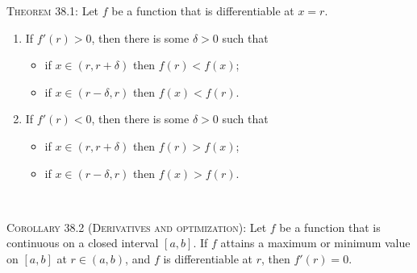 \documentclass[12pt]{amsart}
\numberwithin{equation}{section}
\theoremstyle{plain} %
\theoremstyle{definition}
\theoremstyle{remark}
\begin{document}
\begin{framed} 
 \noindent \textsc{Theorem 38.1:} Let $f$ be a function that is differentiable at $x=r$.
 \begin{enumerate}
 \item 
 If $f'(r) > 0$, then there is some $\delta>0$ such that 
 \begin{itemize}
 \item if $x\in (r,r+\delta)$ then $f(r) < f(x)$;
  \item if $x\in (r-\delta,r)$ then $f(x) < f(r)$.
  \end{itemize}
  

  
  \item  If $f'(r) < 0$, then there is some $\delta>0$ such that 
  \begin{itemize}
 \item if $x\in (r,r+\delta)$ then $f(r) > f(x)$;
 \item if $x\in (r-\delta,r)$ then $f(x) > f(r)$.
  \end{itemize}
  \end{enumerate}
  
  \
  
  \noindent \textsc{Corollary 38.2 (Derivatives and optimization):}
  Let $f$ be a function that is continuous on a closed interval $[a,b]$. If $f$ attains a maximum or minimum value on $[a,b]$ at $r\in (a,b)$, and $f$ is differentiable at $r$, then $f'(r)=0$.
 \end{framed}


\
\end{document}
